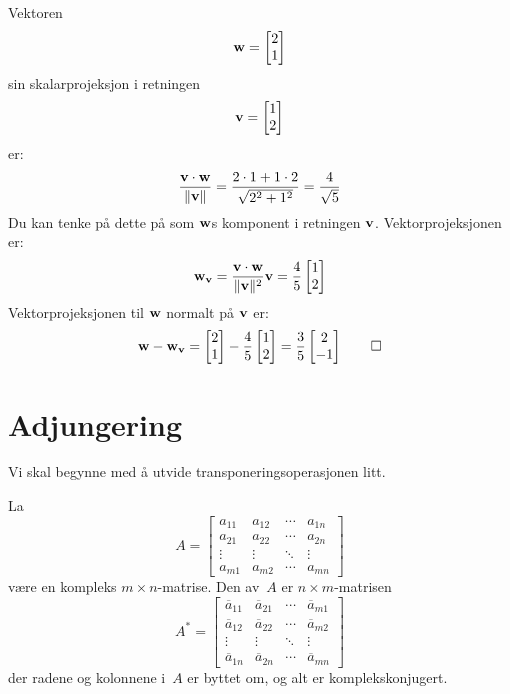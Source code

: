 \begin{ex}
Vektoren
\[
\mathbf{w}
=
\begin{bmatrix}
2 \\ 1
\end{bmatrix}
\]
sin skalarprojeksjon i retningen
\[
\mathbf{v}
=
\begin{bmatrix}
1 \\ 2
\end{bmatrix}
\]
er:
\[
\frac{\mathbf{v} \cdot \mathbf{w}}{\|\mathbf{v}\|}=\frac{2 \cdot 1+1\cdot 2}{\sqrt{2^2+1^2}}=\frac{4}{\sqrt{5}}
\]
Du kan tenke på dette på som $\mathbf{w}$s komponent i retningen $\mathbf{v}$. Vektorprojeksjonen er:
\[
\mathbf{w}_{\mathbf{v}}=\frac{\mathbf{v} \cdot \mathbf{w}}{\|\mathbf{v}\|^2}\mathbf{v}=
\frac{4}{5}
\begin{bmatrix}
1 \\ 2
\end{bmatrix} 
\]
Vektorprojeksjonen til $\mathbf{w}$ normalt på $\mathbf{v}$ er:
\[
\mathbf{w} - \mathbf{w}_{\mathbf{v}}=
\begin{bmatrix}
2 \\ 1
\end{bmatrix} 
-
\frac{4}{5}
\begin{bmatrix}
1 \\ 2
\end{bmatrix}
=
\frac{3}{5}
\begin{bmatrix}
2 \\ -1
\end{bmatrix} \qedhere
\]
\end{ex}
 
\section*{Adjungering}

Vi skal begynne med å utvide transponeringsoperasjonen litt. 

\begin{defn}
La
\[
A =
\begin{bmatrix}
a_{11} & a_{12} & \cdots & a_{1n} \\
a_{21} & a_{22} & \cdots & a_{2n} \\
\vdots & \vdots & \ddots & \vdots \\
a_{m1} & a_{m2} & \cdots & a_{mn}
\end{bmatrix}
\]
være en kompleks $m \times n$-matrise.  Den  av~$A$ er
$n \times m$-matrisen
\[
A^* =
\begin{bmatrix}
\overline a_{11} & \overline a_{21} & \cdots & \overline a_{m1} \\
\overline a_{12} & \overline a_{22} & \cdots & \overline a_{m2} \\
\vdots & \vdots & \ddots & \vdots \\
\overline a_{1n} & \overline a_{2n} & \cdots & \overline a_{mn}
\end{bmatrix}
\]
der radene og kolonnene i~$A$ er byttet om, og alt er komplekskonjugert.
\end{defn}


